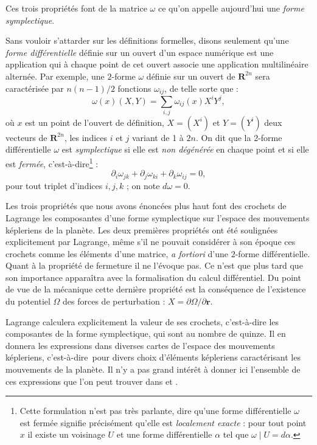 \documentclass[12pt,paperletter, reqno]{amsart}
\newcommand{\rr}{\mathbf{r}}
\newcommand{\RR}{\mathbf{R}}
\newcommand{\cad}{c'est-\`a-dire}
\theoremstyle{plain}
\theoremstyle{remark}
\begin{document}
  Ces trois propriétés font de la matrice $\omega$ ce qu'on appelle aujourd'hui une \emph{forme symplectique}.
  
  Sans vouloir s'attarder sur les définitions formelles,
  disons seulement qu'une \emph{forme différentielle} définie sur un ouvert d'un espace numérique est une application qui à chaque point de cet ouvert associe une application multilinéaire alternée.
  Par exemple,
  une $2$-forme $\omega$ définie sur un ouvert de $\RR^{2n}$ sera caractérisée par $n(n-1)/2$ fonctions $\omega_{ij}$,
  de telle sorte que :
  \begin{equation}
    \omega(x)(X,Y) = \sum_{i,j} \omega_{ij}(x) X^i Y^j,
  \end{equation}
  où $x$ est un point de l'ouvert de définition,
  $X=(X^i)$ et $Y=(Y^i)$ deux vecteurs de $\RR^{2n}$,
  les indices $i$ et $j$ variant de 1 à $2n$.
  On dit que la 2-forme différentielle $\omega$ est \emph{symplectique} si elle est \emph{non dégénérée} en chaque point et si elle est \emph{fermée},
  \cad\footnote{Cette formulation n'est pas très parlante, dire qu'une forme différentielle $\omega$ est fermée signifie précisément qu'elle est \emph{localement exacte} : pour tout point $x$ il existe un voisinage $U$ et une forme différentielle $\alpha$ tel que $\omega\mid U=d\alpha$.} :
  \begin{equation}
    \partial_i\omega_{jk} + \partial_j\omega_{ki} + \partial_k\omega_{ij} =0,
  \end{equation}
  pour tout triplet d'indices $i,j,k$ ;
  on note $d\omega =0$.
  
  Les trois propriétés que nous avons énoncées plus haut font des crochets de Lagrange les composantes d'une forme symplectique sur l'espace des mouvements képleriens de la planète.
  Les deux premières propriétés ont été soulignées explicitement par Lagrange,
  même s'il ne pouvait considérer à son époque ces crochets comme les éléments d'une matrice,
  \emph{a fortiori} d'une $2$-forme différentielle.
  Quant à la propriété de fermeture il ne l'évoque pas.
  Ce n'est que plus tard que son importance apparaîtra avec la formalisation du calcul différentiel.
  Du point de vue de la mécanique cette dernière propriété est la conséquence de l'existence du potentiel $\Omega$ des forces de perturbation :
  $X=\partial \Omega / \partial \rr$.
  
  Lagrange calculera explicitement la valeur de ses crochets,
  c'est-à-dire les composantes de la forme symplectique,
  qui sont au nombre de quinze.
  Il en donnera les expressions dans diverses cartes de l'espace des mouvements képleriens,
  \cad\ pour divers choix d'éléments képleriens caractérisant les mouvements de la planète.
  Il n'y a pas grand intérêt à donner ici l'ensemble de ces expressions que l'on peut trouver dans \cite{Lagrange2} et \cite{Lagrange1}.
  
\end{document}
